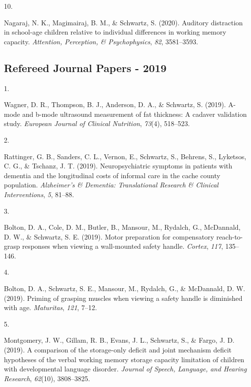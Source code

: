 \documentclass[11pt,a4paper,]{moderncv}
\newlength{\csllabelwidth}
\newcommand{\CSLLeftMargin}[1]{\parbox[t]{\csllabelwidth}{#1}}
\newcommand{\CSLRightInline}[1]{\parbox[t]{\linewidth - \csllabelwidth}{#1}}
\begin{document}
\leavevmode\hypertarget{ref-nagaraj2020auditory}{}%
\CSLLeftMargin{10. }
\CSLRightInline{Nagaraj, N. K., Magimairaj, B. M., \& Schwartz, S.
(2020). Auditory distraction in school-age children relative to
individual differences in working memory capacity. \emph{Attention,
Perception, \& Psychophysics}, \emph{82}, 3581--3593.}

\vspace{7mm}

\hypertarget{refereed-journal-papers---2019}{%
\subsection{\texorpdfstring{\textbf{Refereed Journal Papers -
2019}}{Refereed Journal Papers - 2019}}\label{refereed-journal-papers---2019}}

\hypertarget{refs_journals2019}{}
\leavevmode\hypertarget{ref-wagner2019mode}{}%
\CSLLeftMargin{1. }
\CSLRightInline{Wagner, D. R., Thompson, B. J., Anderson, D. A., \&
Schwartz, S. (2019). A-mode and b-mode ultrasound measurement of fat
thickness: A cadaver validation study. \emph{European Journal of
Clinical Nutrition}, \emph{73}(4), 518--523.}

\leavevmode\hypertarget{ref-rattinger2019neuropsychiatric}{}%
\CSLLeftMargin{2. }
\CSLRightInline{Rattinger, G. B., Sanders, C. L., Vernon, E., Schwartz,
S., Behrens, S., Lyketsos, C. G., \& Tschanz, J. T. (2019).
Neuropsychiatric symptoms in patients with dementia and the longitudinal
costs of informal care in the cache county population. \emph{Alzheimer's
\& Dementia: Translational Research \& Clinical Interventions},
\emph{5}, 81--88.}

\leavevmode\hypertarget{ref-bolton2019motor}{}%
\CSLLeftMargin{3. }
\CSLRightInline{Bolton, D. A., Cole, D. M., Butler, B., Mansour, M.,
Rydalch, G., McDannald, D. W., \& Schwartz, S. E. (2019). Motor
preparation for compensatory reach-to-grasp responses when viewing a
wall-mounted safety handle. \emph{Cortex}, \emph{117}, 135--146.}

\leavevmode\hypertarget{ref-bolton2019priming}{}%
\CSLLeftMargin{4. }
\CSLRightInline{Bolton, D. A., Schwartz, S. E., Mansour, M., Rydalch,
G., \& McDannald, D. W. (2019). Priming of grasping muscles when viewing
a safety handle is diminished with age. \emph{Maturitas}, \emph{121},
7--12.}

\leavevmode\hypertarget{ref-montgomery2019comparison}{}%
\CSLLeftMargin{5. }
\CSLRightInline{Montgomery, J. W., Gillam, R. B., Evans, J. L.,
Schwartz, S., \& Fargo, J. D. (2019). A comparison of the storage-only
deficit and joint mechanism deficit hypotheses of the verbal working
memory storage capacity limitation of children with developmental
language disorder. \emph{Journal of Speech, Language, and Hearing
Research}, \emph{62}(10), 3808--3825.}
\end{document}

